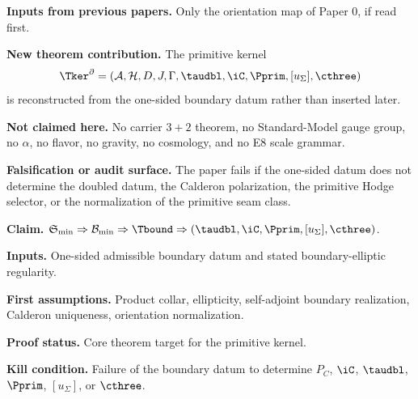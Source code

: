 
\maketitle

\begin{abstract}
This paper isolates the primitive boundary kernel. Starting from the minimal operational seed and
the one-sided boundary datum, it reconstructs the exact double, the deck involution, the Calderon
polarization, the primitive admissibility complex, the primitive seam generator, the winding
normalization $[u_\Sigma]=1$, and the normalization $\cthree=1/(8\pi)$. No Standard-Model,
phenomenological, gravitational, cosmological, or E8 claim is made in this paper.
\end{abstract}

\begin{tfptfrontbox}
\textbf{Inputs from previous papers.} Only the orientation map of Paper 0, if read first.

\textbf{New theorem contribution.} The primitive kernel
\[
\Tker^\partial=(\mathcal A,\mathcal H,D,J,\Gamma,\taudbl,\iC,\Pprim,[u_\Sigma],\cthree)
\]
is reconstructed from the one-sided boundary datum rather than inserted later.

\textbf{Not claimed here.} No carrier $3+2$ theorem, no Standard-Model gauge group, no $\alpha$,
no flavor, no gravity, no cosmology, and no E8 scale grammar.

\textbf{Falsification or audit surface.} The paper fails if the one-sided datum does not determine
the doubled datum, the Calderon polarization, the primitive Hodge selector, or the normalization of
the primitive seam class.
\end{tfptfrontbox}


\begin{tfptclaimcontract}
\textbf{Claim.} $\mathfrak S_{\min}\Rightarrow\mathcal B_{\min}\Rightarrow\Tbound\Rightarrow(\taudbl,\iC,\Pprim,[u_\Sigma],\cthree)$.\par
\textbf{Inputs.} One-sided admissible boundary datum and stated boundary-elliptic regularity.\par
\textbf{First assumptions.} Product collar, ellipticity, self-adjoint boundary realization, Calderon uniqueness, orientation normalization.\par
\textbf{Proof status.} Core theorem target for the primitive kernel.\par
\textbf{Kill condition.} Failure of the boundary datum to determine $P_C$, $\iC$, $\taudbl$, $\Pprim$, $[u_\Sigma]$, or $\cthree$.\par
\end{tfptclaimcontract}

